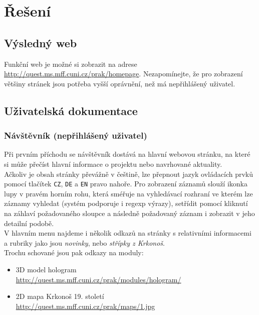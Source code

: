 \chapter{Řešení}


\section{Výsledný web}
Funkční web je možné si zobrazit na adrese \url{http://quest.ms.mff.cuni.cz/prak/homepage}.
Nezapomínejte, že pro zobrazení většiny stránek jsou potřeba vyšší oprávnění,
než má nepřihlášený uživatel.

\section{Uživatelská dokumentace}
\subsection{Návštěvník (nepřihlášený uživatel)}
Při prvním příchodu se návštěvník dostává na hlavní webovou stránku,
na které si může přečíst hlavní informace o projektu nebo
navrhované aktuality.\\
Ačkoliv je obsah stránky převážně v češtině, lze přepnout jazyk ovládacích prvků
pomocí tlačítek \texttt{CZ}, \texttt{DE} a \texttt{EN} pravo nahoře.
Pro zobrazení záznamů slouží ikonka lupy v pravém horním rohu, která sméřuje na
vyhledávací rozhraní ve kterém lze záznamy vyhledat (systém podporuje i regexp výrazy),
setřídit pomocí kliknutí na záhlaví požadovaného sloupce a následně požadovaný záznam i 
zobrazit v jeho detailní podobě.\\
V hlavním menu najdeme i několik odkazů na stránky s relativními informacemi a
rubriky jako jsou \textit{novinky}, nebo \textit{střípky z Krkonoš}.\\
Trochu schované jsou pak odkazy na moduly:
\begin{itemize}
	\item 3D model hologram \\
		\url{http://quest.ms.mff.cuni.cz/prak/modules/hologram/}
	\item 2D mapa Krkonoš 19. století \\
		\url{http://quest.ms.mff.cuni.cz/prak/maps/1.jpg}
\end{itemize}

